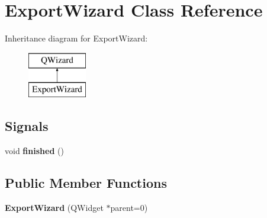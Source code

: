 \hypertarget{class_export_wizard}{}\section{Export\+Wizard Class Reference}
\label{class_export_wizard}
Inheritance diagram for Export\+Wizard\+:\begin{figure}[H]
\begin{center}
\leavevmode
\includegraphics[height=2.000000cm]{class_export_wizard}
\end{center}
\end{figure}
\subsection*{Signals}
\begin{DoxyCompactItemize}
\item 
\hypertarget{class_export_wizard_aa27cd74a0821b70b2dd278ce519aa13e}{}void {\bfseries finished} ()\label{class_export_wizard_aa27cd74a0821b70b2dd278ce519aa13e}

\end{DoxyCompactItemize}
\subsection*{Public Member Functions}
\begin{DoxyCompactItemize}
\item 
\hypertarget{class_export_wizard_ae29f2a02ce3ae39857a17725f08dc6ba}{}{\bfseries Export\+Wizard} (Q\+Widget $\ast$parent=0)\label{class_export_wizard_ae29f2a02ce3ae39857a17725f08dc6ba}

\end{DoxyCompactItemize}
